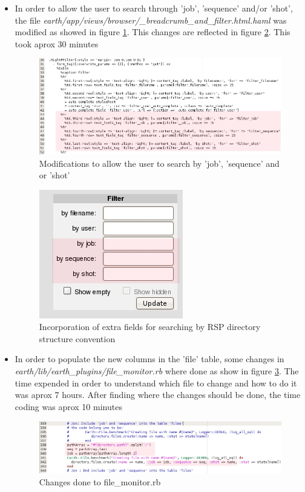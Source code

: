 \documentclass[a4paper,10pt]{article}
\begin{document}
\begin{itemize}
\item In order to allow the user to search through 'job', 'sequence' and/or 'shot', the file \textit{earth/app/views/browser/\_breadcrumb\_and\_filter.html.haml }was modified as showed in figure \ref{fig:bread}. This changes are reflected in figure \ref{fig:earth}.  This took aprox 30 minutes
\begin{figure}[h]
 \centering
 \includegraphics[scale=0.4]{images/bread.jpg}
 \caption{Modifications to allow the user to search by 'job', 'sequence' and or 'shot'}
 \label{fig:bread}
\end{figure}
\begin{figure}[h]
 \centering
 \includegraphics[scale=0.5]{images/earth.jpg}
 \caption{Incorporation of extra fields for searching by RSP directory structure convention}
 \label{fig:earth}
\end{figure}

\item In order to populate the new columns in the 'file' table, some changes in \textit{earth/lib/earth\_plugins/file\_monitor.rb }where done as show in figure \ref{fig:monitor}.  The time expended in order to understand which file to change and how to do it was aprox 7 hours.  After finding  where the changes should be done, the time coding was aprox 10 minutes
\begin{figure}[h]
 \centering
 \includegraphics[scale=0.4]{images/monitor.jpg}
 \caption{Changes done to file\_monitor.rb}
 \label{fig:monitor}
\end{figure}


\end{itemize}
\end{document}
